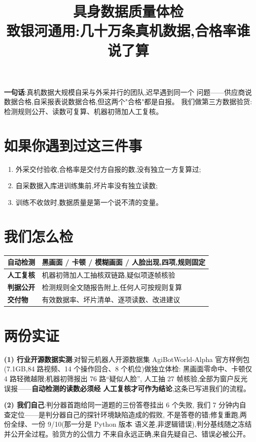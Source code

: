 \documentclass[10pt,a4paper]{ctexart}
\title{\vspace{-1.6em}\textcolor{acc}{具身数据质量体检}\\[0.2em]
\large 致银河通用:几十万条真机数据,合格率谁说了算}
\author{}
\date{}
\begin{document}
\maketitle
\vspace{-3.2em}

\noindent\textbf{一句话}:真机数据大规模自采与外采并行的团队,迟早遇到同一个
问题——供应商说数据合格,自采报表说数据合格,但这两个"合格"都是自报。
我们做第三方数据验货:检测规则公开、读数可复算、机器初筛加人工复核。

\section*{如果你遇到过这三件事}
\begin{enumerate}
\item 外采交付验收,合格率是交付方自报的数,没有独立一方复算过;
\item 自采数据入库进训练集前,坏片率没有独立读数;
\item 训练不收敛时,数据质量是第一个说不清的变量。
\end{enumerate}

\section*{我们怎么检}
\noindent
\begin{tabular}{@{}p{2.6cm}p{12.6cm}@{}}
\toprule
\textbf{自动检测} & 黑画面 / 卡顿 / 模糊画面 / 人脸出现,四项,规则固定 \\
\midrule
\textbf{人工复核} & 机器初筛加人工抽核双链路,疑似项逐帧核验 \\
\midrule
\textbf{判据公开} & 检测规则全文随报告附上,任何人可按规则复算 \\
\midrule
\textbf{交付物} & 有效数据率、坏片清单、逐项读数、改进建议 \\
\bottomrule
\end{tabular}

\section*{两份实证}
\textbf{(1) 行业开源数据实测}:对智元机器人开源数据集 AgiBotWorld-Alpha
官方样例包(7.1GB,84 路视频、14 个操作回合、8 个机位)做独立体检:
黑画面零命中、卡顿仅 4 路轻微越限;机器初筛报出 76 路“疑似人脸”,
人工抽 27 帧核验,全部为窗户反光误报——\textbf{自动检测的读数必须经
人工复核才可作为结论},这条已写进我们的流程。

\textbf{(2) 我们自己}:判分器首跑给同一道题的三份答卷挂出 6 个失败,
我们 7 分钟内自查定位——是判分器自己的探针环境缺陷造成的假败,
不是答卷的错;修复重跑,两份全绿、一份 9/10(那一分是 Python 版本
语义差,非逻辑错误),判分基线随之冻结并公开全过程。验货方的公信力
不来自永远正确,来自先疑自己、错误必被公开。
\end{document}
